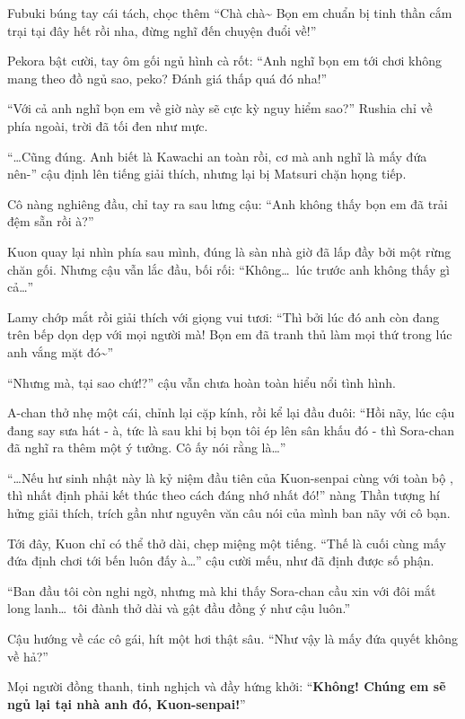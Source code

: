 \documentclass[../main.tex]{subfiles}
\begin{document}
Fubuki búng tay cái tách, chọc thêm ``Chà chà\~{} Bọn em chuẩn bị tinh thần cắm trại tại đây hết rồi nha, đừng nghĩ đến chuyện đuổi về!''

Pekora bật cười, tay ôm gối ngủ hình cà rốt: ``Anh nghĩ bọn em tới chơi không mang theo đồ ngủ sao, peko? Đánh giá thấp quá đó nha!''

``Với cả anh nghĩ bọn em về giờ này sẽ cực kỳ nguy hiểm sao?'' Rushia chỉ về phía ngoài, trời đã tối đen như mực.

``\dots Cũng đúng. Anh biết là Kawachi an toàn rồi, cơ mà anh nghĩ là mấy đứa nên-'' cậu định lên tiếng giải thích, nhưng lại bị Matsuri chặn họng tiếp.

Cô nàng nghiêng đầu, chỉ tay ra sau lưng cậu: ``Anh không thấy bọn em đã trải đệm sẵn rồi à?''

Kuon quay lại nhìn phía sau mình, đúng là sàn nhà giờ đã lấp đầy bởi một rừng chăn gối. Nhưng cậu vẫn lắc đầu, bối rối: ``Không\dots\ lúc trước anh không thấy gì cả\dots''

Lamy chớp mắt rồi giải thích với giọng vui tươi: ``Thì bởi lúc đó anh còn đang trên bếp dọn dẹp với mọi người mà! Bọn em đã tranh thủ làm mọi thứ trong lúc anh vắng mặt đó\~{}''

``Nhưng mà, tại sao chứ!?'' cậu vẫn chưa hoàn toàn hiểu nổi tình hình.

A-chan thở nhẹ một cái, chỉnh lại cặp kính, rồi kể lại đầu đuôi: ``Hồi nãy, lúc cậu đang say sưa hát - à, tức là sau khi bị bọn tôi ép lên sân khấu đó - thì Sora-chan đã nghĩ ra thêm một ý tưởng. Cô ấy nói rằng là\dots''

``\dots Nếu hư sinh nhật này là kỷ niệm đầu tiên của Kuon-senpai cùng với toàn bộ \hll, thì nhất định phải kết thúc theo cách đáng nhớ nhất đó!'' nàng Thần tượng hí hửng giải thích, trích gần như nguyên văn câu nói của mình ban nãy với cô bạn.

Tới đây, Kuon chỉ có thể thở dài, chẹp miệng một tiếng. ``Thế là cuối cùng mấy đứa định chơi tới bến luôn đấy à\dots'' cậu cười mếu, như đã định được số phận.

``Ban đầu tôi còn nghi ngờ, nhưng mà khi thấy Sora-chan cầu xin với đôi mắt long lanh\dots\ tôi đành thở dài và gật đầu đồng ý như cậu luôn.''

Cậu hướng về các cô gái, hít một hơi thật sâu. ``Như vậy là mấy đứa quyết không về hả?''

Mọi người đồng thanh, tinh nghịch và đầy hứng khởi: ``\textbf{Không! Chúng em sẽ ngủ lại tại nhà anh đó, Kuon-senpai!}''
\end{document}
